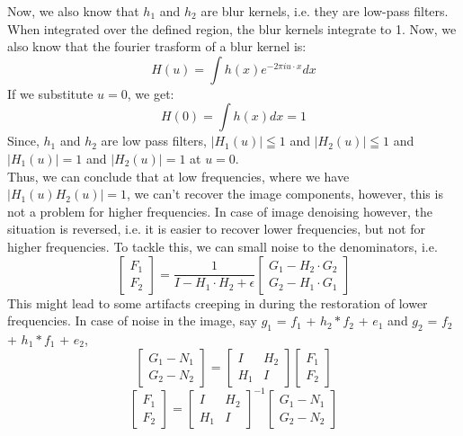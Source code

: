 \documentclass{article}
\begin{document}
\begin{enumerate}
    Now, we also know that $h_1$ and $h_2$ are blur kernels, i.e. they are low-pass filters. When integrated over the 
    defined region, the blur kernels integrate to 1. Now, we also know that the fourier trasform of a blur kernel is:
    \[
        H(u) = \int h(x) e^{-2\pi i u \cdot x} dx
    \]
    If we substitute $u = 0$, we get:
    \[
        H(0) = \int h(x) dx = 1
    \]
    Since, $h_1$ and $h_2$ are low pass filters, $|H_1(u)| \leqq 1$ and $|H_2(u)| \leqq 1$ and $|H_1(u)| = 1$ and $|H_2(u)| = 1$ at $u = 0$. \\
    Thus, we can conclude that at low frequencies, where we have $|H_1(u)H_2(u)| = 1$, we can't recover the image components, however, this is not a problem for higher frequencies. In case of image denoising however, the situation is reversed, i.e. it is easier to recover lower frequencies, but not for higher frequencies. To tackle this, we can small noise to the denominators, i.e.
     \[
        \begin{bmatrix}
            F_1 \\
            F_2
        \end{bmatrix}
        =
        \frac{1}{I - H_1 \cdot H_2 + \epsilon}
        \begin{bmatrix}
            G_1 - H_2 \cdot G_2 \\
            G_2 - H_1 \cdot G_1
        \end{bmatrix}
    \]
     This might lead to some artifacts creeping in during the restoration of lower frequencies.
     In case of noise in the image, say $g_1$ = $f_1$ + $h_2 * f_2$ + $e_1$ and $g_2$ = $f_2$ + $h_1 * f_1$ + $e_2$,
    \[
        \begin{bmatrix}
            G_1 - N_1 \\
            G_2 - N_2
        \end{bmatrix}
        =
        \begin{bmatrix}
            I & H_2 \\
            H_1 & I
        \end{bmatrix}
        \begin{bmatrix}
            F_1 \\
            F_2
        \end{bmatrix}
    \]
    \[
        \begin{bmatrix}
            F_1 \\
            F_2
        \end{bmatrix}
        =
        \begin{bmatrix}
            I & H_2 \\
            H_1 & I
        \end{bmatrix}^{-1}
        \begin{bmatrix}
            G_1 - N_1\\
            G_2 - N_2
        \end{bmatrix}
    \]
    

\end{enumerate}
\end{document}
